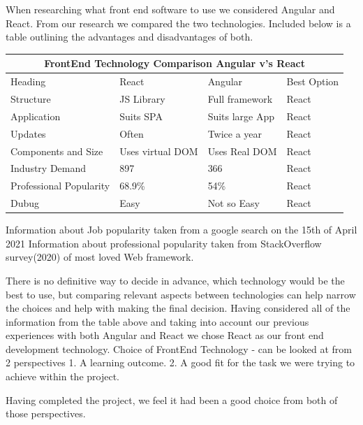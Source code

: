 \vspace{5mm}
When researching what front end software to use we considered Angular and React. From our research we compared the two technologies. Included below is a table outlining the advantages and disadvantages of both.
\begin{table}[ht]
\centering
\begin{tabular}{ |p{3cm}||p{3cm}|p{3cm}|p{3cm}| }
 \hline
 \multicolumn{4}{|c|}{FrontEnd Technology Comparison Angular v's React} \\

 \hline
 Heading& React& Angular&Best Option\\
 \hline
 Structure   & JS Library    &Full framework &  React\\
 Application & Suits SPA    & Suits large App   &React\\
 Updates &Often & Twice a year&  React\\
 Components and Size    &Uses virtual DOM & Uses Real DOM&  React\\
 Industry Demand&   897  & 366& React\\
 Professional Popularity& 68.9\% &54\%   &React\\
 Dubug& Easy& Not so Easy& React\\

 \hline
\end{tabular}
\end{table}

\hfill \break


Information about Job popularity taken from a google search on the 15th of April 2021
Information about professional popularity taken from StackOverflow survey(2020) of most loved Web framework.\cite{favtech}

\vspace{5mm}
There is no definitive way to decide in advance, which technology would be the best to use, but comparing relevant aspects between technologies can help narrow the choices and help with making the final decision. Having considered all of the information from the table above and taking into account our previous experiences with both Angular and React we chose React as our front end development technology.
Choice of FrontEnd Technology - can be looked at from 2 perspectives 1. A learning outcome.
2. A good fit for the task we were trying to achieve within the project.

Having completed the project, we feel it had been a good choice from both of those perspectives.

